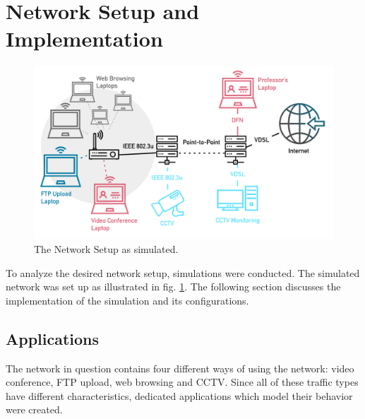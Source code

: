 \documentclass[
10pt, %
a4paper, %
oneside, %
headinclude,footinclude, %
BCOR5mm, %
]{scrartcl}
\begin{document}
\newpage %


\section{Network Setup and Implementation}

\begin{figure}[!ht]
  \centering
  \includegraphics[width=\textwidth]{Figures/network.pdf}
  \caption{The Network Setup as simulated.} \label{fig:network}
\end{figure}

To analyze the desired network setup, simulations were conducted. The simulated network was set up as illustrated in fig. \ref{fig:network}. The following section discusses the implementation of the simulation and its configurations.

\subsection{Applications}
\label{subsec:apps}
The network in question contains four different ways of using the network: video conference, FTP upload, web browsing and CCTV. Since all of these traffic types have different characteristics, dedicated applications which model their behavior were created.
\end{document}
